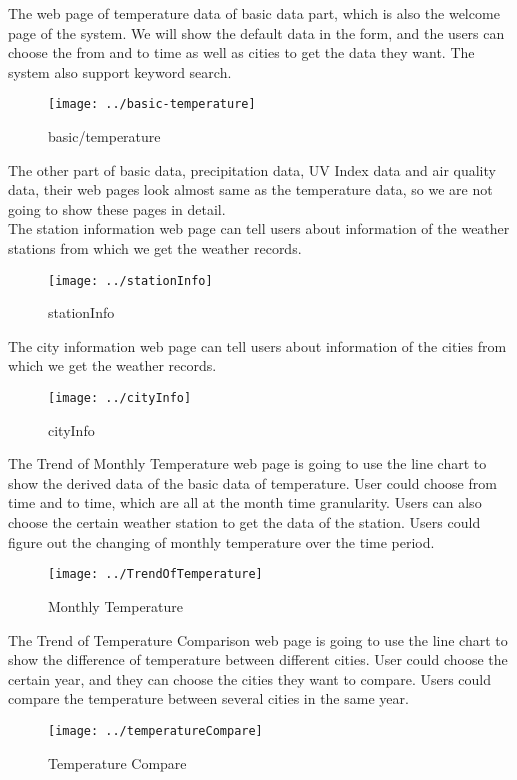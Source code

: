 \documentclass[]{article}
\begin{document}
	\noindent The web page of temperature data of basic data part, which is also the welcome page of the system. We will show the default data in the form, and the users can choose the from and to time as well as cities to get the data they want. The system also support keyword search.
	\begin{figure}[H]
		\centering
		\texttt{[image: ../basic-temperature]}
		\caption{basic/temperature}
		\label{fig:basic-temperature}
	\end{figure}

	\noindent The other part of basic data, precipitation data, UV Index data and air quality data, their web pages look almost same as the temperature data, so we are not going to show these pages in detail. \\
	
	\noindent The station information web page can tell users about information of the weather stations from which we get the weather records.
	\begin{figure}[H]
		\centering
		\texttt{[image: ../stationInfo]}
		\caption{stationInfo}
		\label{fig:stationinfo}
	\end{figure}
	
	\noindent The city information web page can tell users about information of the cities from which we get the weather records.
	\begin{figure}[H]
		\centering
		\texttt{[image: ../cityInfo]}
		\caption{cityInfo}
		\label{fig:cityinfo}
	\end{figure}
	
	\noindent The Trend of Monthly Temperature web page is going to use the line chart to show the derived data of the basic data of temperature. User could choose from time and to time, which are all at the month time granularity. Users can also choose the certain weather station to get the data of the station. Users could figure out the changing of monthly temperature over the time period.
	\begin{figure}[H]
		\centering
		\texttt{[image: ../TrendOfTemperature]}
		\caption{Monthly Temperature}
		\label{fig:trendoftemperature}
	\end{figure}

	\noindent The Trend of Temperature Comparison web page is going to use the line chart to show the difference of temperature between different cities. User could choose the certain year, and they can choose the cities they want to compare. Users could compare the temperature between several cities in the same year.
	\begin{figure}[H]
		\centering
		\texttt{[image: ../temperatureCompare]}
		\caption{Temperature Compare}
		\label{fig:temperaturecompare}
	\end{figure}
	
\end{document}
